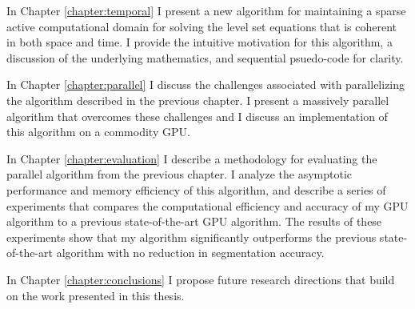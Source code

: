 In Chapter \ref{chapter:temporal} I present a new algorithm for maintaining a sparse active computational domain for solving the level set equations that is coherent in both space and time. I provide the intuitive motivation for this algorithm, a discussion of the underlying mathematics, and sequential psuedo-code for clarity.

In Chapter \ref{chapter:parallel} I discuss the challenges associated with parallelizing the algorithm described in the previous chapter. I present a massively parallel algorithm that overcomes these challenges and I discuss an implementation of this algorithm on a commodity GPU.

In Chapter \ref{chapter:evaluation} I describe a methodology for evaluating the parallel algorithm from the previous chapter. I analyze the asymptotic performance and memory efficiency of this algorithm, and describe a series of experiments that compares the computational efficiency and accuracy of my GPU algorithm to a previous state-of-the-art GPU algorithm. The results of these experiments show that my algorithm significantly outperforms the previous state-of-the-art algorithm with no reduction in segmentation accuracy.

In Chapter \ref{chapter:conclusions} I propose future research directions that build on the work presented in this thesis.


